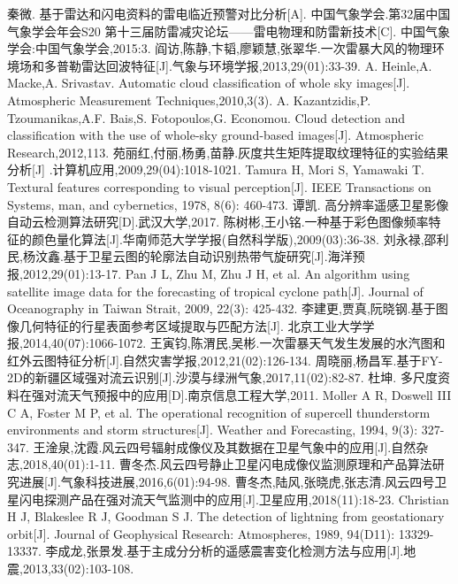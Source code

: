 
\begin{thebibliography}{99}
  秦微. 基于雷达和闪电资料的雷电临近预警对比分析[A]. 中国气象学会.第32届中国气象学会年会S20 第十三届防雷减灾论坛——雷电物理和防雷新技术[C].
  中国气象学会:中国气象学会,2015:3.
  阎访,陈静,卞韬,廖颖慧,张翠华.一次雷暴大风的物理环境场和多普勒雷达回波特征[J].气象与环境学报,2013,29(01):33-39.
  A. Heinle,A. Macke,A. Srivastav. Automatic cloud classification of whole sky images[J]. 
  Atmospheric Measurement Techniques,2010,3(3).
  A. Kazantzidis,P. Tzoumanikas,A.F. Bais,S. Fotopoulos,G. Economou. Cloud detection and 
  classification with the use of whole-sky ground-based images[J]. Atmospheric Research,2012,113.
  苑丽红,付丽,杨勇,苗静.灰度共生矩阵提取纹理特征的实验结果分析[J]
  .计算机应用,2009,29(04):1018-1021.
  Tamura H, Mori S, Yamawaki T. Textural features corresponding to visual perception[J]. IEEE Transactions on Systems, man, and cybernetics, 1978, 8(6): 460-473.
  谭凯. 高分辨率遥感卫星影像自动云检测算法研究[D].武汉大学,2017.
  陈树彬,王小铭.一种基于彩色图像频率特征的颜色量化算法[J].华南师范大学学报(自然科学版),2009(03):36-38.
  刘永禄,邵利民,杨汶鑫.基于卫星云图的轮廓法自动识别热带气旋研究[J].海洋预报,2012,29(01):13-17.
  Pan J L, Zhu M, Zhu J H, et al. An algorithm using satellite image data for the forecasting of tropical cyclone path[J]. Journal of
  Oceanography in Taiwan Strait, 2009, 22(3): 425-432.
  李建更,贾真,阮晓钢.基于图像几何特征的行星表面参考区域提取与匹配方法[J].
  北京工业大学学报,2014,40(07):1066-1072.
  王寅钧,陈渭民,吴彬.一次雷暴天气发生发展的水汽图和红外云图特征分析[J].自然灾害学报,2012,21(02):126-134.
  周晓丽,杨昌军.基于FY-2D的新疆区域强对流云识别[J].沙漠与绿洲气象,2017,11(02):82-87.
  杜坤. 多尺度资料在强对流天气预报中的应用[D].南京信息工程大学,2011.
  Moller A R, Doswell III C A, Foster M P, et al. The operational recognition of supercell thunderstorm environments and storm structures[J]. Weather and Forecasting, 1994, 9(3): 327-347.
  王淦泉,沈霞.风云四号辐射成像仪及其数据在卫星气象中的应用[J].自然杂志,2018,40(01):1-11.
  曹冬杰.风云四号静止卫星闪电成像仪监测原理和产品算法研究进展[J].气象科技进展,2016,6(01):94-98.
  曹冬杰,陆风,张晓虎,张志清.风云四号卫星闪电探测产品在强对流天气监测中的应用[J].卫星应用,2018(11):18-23.
  Christian H J, Blakeslee R J, Goodman S J. The detection of lightning from geostationary orbit[J]. Journal of Geophysical Research: Atmospheres, 1989, 94(D11): 13329-13337.
  李成龙,张景发.基于主成分分析的遥感震害变化检测方法与应用[J].地震,2013,33(02):103-108.
\end{thebibliography}
